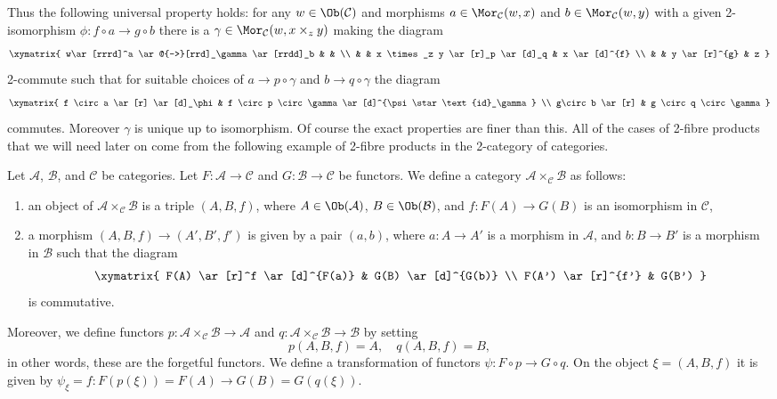 \noindent
Thus the following universal property holds: for any
$w\in \Ob(\mathcal{C})$ and morphisms
$a \in \Mor_{\mathcal C}(w, x)$ and
$b \in \Mor_\mathcal{C}(w, y)$ with a given 2-isomorphism
$\phi : f \circ a \to g\circ b$
there is a $\gamma \in \Mor_{\mathcal C}(w, x \times_z y)$
making the diagram
$$
\xymatrix{
w\ar[rrrd]^a \ar@{-->}[rrd]_\gamma \ar[rrdd]_b & & \\
& & x \times_z y \ar[r]_p \ar[d]_q & x \ar[d]^{f} \\
& & y \ar[r]^{g} & z }
$$
2-commute such that for suitable choices of
$a \to p \circ \gamma$ and $b \to q \circ \gamma$
the diagram
$$
\xymatrix{
f \circ a \ar[r] \ar[d]_\phi &
f \circ p \circ \gamma
\ar[d]^{\psi \star \text{id}_\gamma}
\\
g\circ b
\ar[r]
&
g \circ q \circ \gamma
}
$$
commutes. Moreover $\gamma$ is unique up to isomorphism.
Of course the exact properties are finer than this. All of the
cases of 2-fibre products that we will need later on come from the following
example of 2-fibre products in the 2-category of categories.

\begin{example}
\label{example-2-fibre-product-categories}
Let $\mathcal{A}$, $\mathcal{B}$, and $\mathcal{C}$ be categories.
Let $F : \mathcal{A} \to \mathcal{C}$ and $G : \mathcal{B} \to \mathcal{C}$
be functors. We define a category
$\mathcal{A} \times_\mathcal{C} \mathcal{B}$ as follows:
\begin{enumerate}
\item an object of $\mathcal{A} \times_\mathcal{C} \mathcal{B}$ is a triple
$(A, B, f)$, where $A\in \Ob(\mathcal{A})$, $B\in \Ob(\mathcal{B})$,
and $f : F(A) \to G(B)$ is an isomorphism in $\mathcal{C}$,
\item a morphism $(A, B, f) \to (A', B', f')$ is given by a pair $(a, b)$, where
$a : A \to A'$ is a morphism in $\mathcal{A}$, and $b : B \to B'$ is a
morphism in $\mathcal{B}$ such that the diagram
$$
\xymatrix{
F(A) \ar[r]^f \ar[d]^{F(a)} & G(B) \ar[d]^{G(b)} \\
F(A') \ar[r]^{f'} & G(B')
}
$$
is commutative.
\end{enumerate}
Moreover, we define functors
$p : \mathcal{A} \times_\mathcal{C}\mathcal{B} \to \mathcal{A}$
and
$q : \mathcal{A} \times_\mathcal{C}\mathcal{B} \to \mathcal{B}$
by setting
$$
p(A, B, f) = A, \quad q(A, B, f) = B,
$$
in other words, these are the forgetful functors.
We define a transformation of functors $\psi : F \circ p \to G \circ q$.
On the object $\xi = (A, B, f)$ it is given by
$\psi_\xi = f : F(p(\xi)) = F(A) \to G(B) = G(q(\xi))$.
\end{example}

